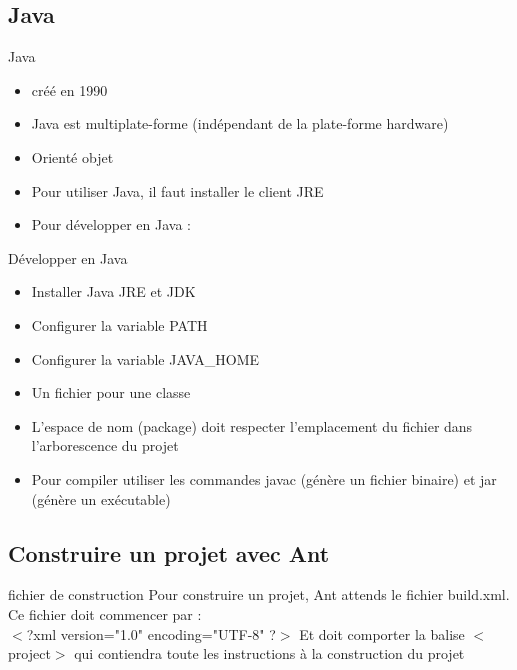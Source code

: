 \documentclass{beamer}
\begin{document}
\subsection{Java}

\begin{frame}{Java}
    \begin{itemize}
        \item cr\'e\'e en 1990
        \item Java est multiplate-forme (ind\'ependant de la plate-forme hardware)
        \item Orient\'e objet
        \item Pour utiliser Java, il faut installer le client JRE
        \item Pour d\'evelopper en Java :
    \end{itemize}
\end{frame}

\begin{frame}{D\'evelopper en Java}
    \begin{itemize}
        \item Installer Java JRE et JDK
        \item Configurer la variable PATH
        \item Configurer la variable JAVA\_HOME
        \item Un fichier pour une classe
        \item L'espace de nom (package) doit respecter l'emplacement du fichier dans l'arborescence du projet
        \item Pour compiler utiliser les commandes javac (g\'en\`ere un fichier binaire) et jar (g\'en\`ere un ex\'ecutable)
    \end{itemize}
\end{frame}

\subsection{Construire un projet avec Ant}

\begin{frame}{fichier de construction}
    Pour construire un projet, Ant attends le fichier build.xml. Ce fichier doit commencer par :\\
    $<$?xml version="1.0" encoding="UTF-8" ?$>$
    \newline
    \newline
    Et doit comporter la balise $<$project$>$ qui contiendra toute les instructions \`a la construction du projet 
\end{frame}
\end{document}
